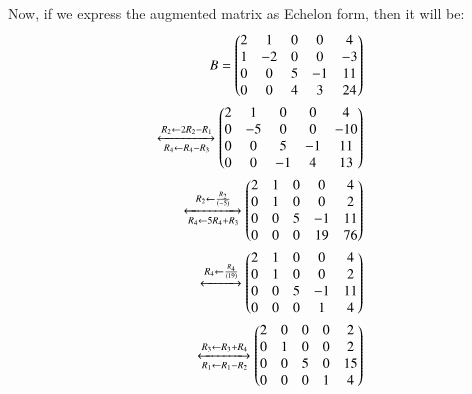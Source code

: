 Now, if we express the augmented matrix as Echelon form, then it will be:\\

\begin{equation}
\begin{aligned}
    B=  \begin{pmatrix}
      2       & 1    & 0   & 0  & 4\\ 
      1       & -2   & 0   & 0  & -3\\
      0       & 0    & 5   & -1  & 11\\ 
      0       & 0   & 4   & 3   & 24\\
            
    \end{pmatrix}\\
    \xleftrightarrow
    [R_4\leftarrow R_4 - R_3]{R_2\leftarrow 2R_2 - R_1} 
    \begin{pmatrix}
      2       & 1    & 0   & 0  & 4\\ 
      0       & -5   & 0   & 0  & -10\\
      0       & 0    & 5   & -1  & 11\\ 
      0       & 0   & -1   & 4   & 13\\
            
    \end{pmatrix}\\
    \xleftrightarrow
    [R_4\leftarrow 5R_4 + R_3]{R_2\leftarrow \frac{R_2}{(-5)}}
    \begin{pmatrix}
      2       & 1    & 0   & 0  & 4\\ 
      0       & 1   & 0   & 0  & 2\\
      0       & 0    & 5   & -1  & 11\\ 
      0       & 0   & 0   & 19   & 76\\
            
    \end{pmatrix}\\
    \xleftrightarrow
    []{R_4\leftarrow \frac{R_4}{(19)}}
    \begin{pmatrix}
      2       & 1    & 0   & 0  & 4\\ 
      0       & 1   & 0   & 0  & 2\\
      0       & 0    & 5   & -1  & 11\\ 
      0       & 0   & 0   & 1   & 4\\
            
    \end{pmatrix}\\
    \xleftrightarrow
    [R_1\leftarrow R_1 -R_2]{R_3\leftarrow R_3 + R_4}
    \begin{pmatrix}
      2       & 0    & 0   & 0  & 2\\ 
      0       & 1   & 0   & 0  & 2\\
      0       & 0    & 5   & 0  & 15\\ 
      0       & 0   & 0   & 1   & 4\\
            

\end{pmatrix}
\end{aligned}
\end{equation}
